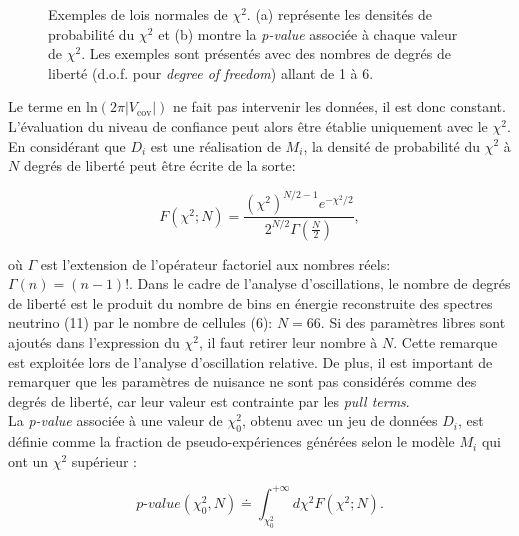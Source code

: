 {\begin{figure}[h!]
\begin{subfigure}[b]{0.49\textwidth}
\caption{}
\label{fig:chi2_p_value_functions_examples.pdf}
\end{subfigure}
\caption[Exemples de lois normales de $\chi^2$]{Exemples de lois normales de $\chi^2$. (a) représente les densités de probabilité du $\chi^2$ et (b) montre la \textit{p-value} associée à chaque valeur de $\chi^2$. Les exemples sont présentés avec des nombres de degrés de liberté (d.o.f. pour \textit{degree of freedom}) allant de 1 à 6.}
\label{fig:chi2_normal_laws}
\end{figure}

}

Le terme en $\textrm{ln}\left(2\pi \left| V_\textrm{cov} \right| \right)$ ne fait pas intervenir les données, il est donc constant. L'évaluation du niveau de confiance peut alors être établie uniquement avec le $\chi^2$. En considérant que $D_i$ est une réalisation de $M_i$, la densité de probabilité du $\chi^2$ à $N$ degrés de liberté peut être écrite de la sorte:

\begin{equation}
    F(\chi^2; N) = \frac{\left( \chi^2 \right)^{N/2 -1} e^{-\chi^2/2}}{2^{N/2} \Gamma\left(\frac{N}{2}\right)},
\end{equation}

\bigbreak

où $\Gamma$ est l'extension de l'opérateur factoriel aux nombres réels: $\Gamma(n) = (n-1)!$. Dans le cadre de l'analyse d'oscillations, le nombre de degrés de liberté est le produit du nombre de bins en énergie reconstruite des spectres neutrino (11) par le nombre de cellules (6): $N = 66$. Si des paramètres libres sont ajoutés dans l'expression du $\chi^2$, il faut retirer leur nombre à $N$. Cette remarque est exploitée lors de l'analyse d'oscillation relative. De plus, il est important de remarquer que les paramètres de nuisance ne sont pas considérés comme des degrés de liberté, car leur valeur est contrainte par les \textit{pull terms}.\\

La \textit{p-value} associée à une valeur de $\chi^2_0$, obtenu avec un jeu de données $D_i$, est définie comme la fraction de pseudo-expériences générées selon le modèle $M_i$ qui ont un $\chi^2$ supérieur :

\begin{equation}
    \textit{p-value}\left(\chi^2_0,N\right) \doteq \int_{\chi^2_0}^{+\infty} d\chi^2 F(\chi^2; N).
\end{equation}

\bigbreak

